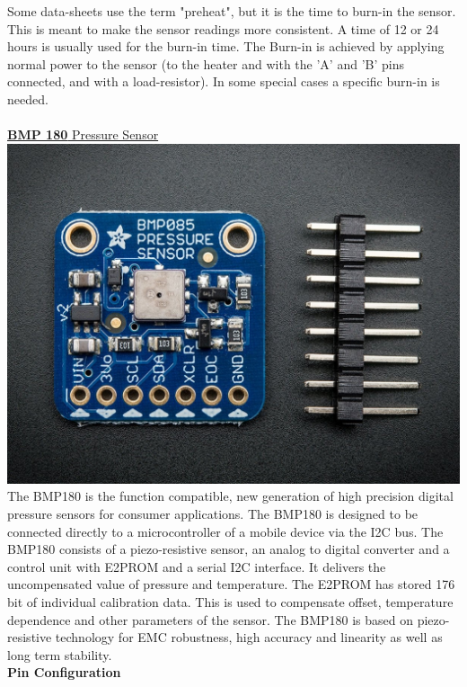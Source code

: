 \documentclass[11pt]{report}
\begin{document}
	Some data-sheets use the term "preheat", but it is the time to burn-in the sensor. This is meant to make the sensor readings more consistent. A time of 12 or 24 hours is usually used for the burn-in time.
	The Burn-in is achieved by applying normal power to the sensor (to the heater and with the 'A' and 'B' pins connected, and with a load-resistor). In some special cases a specific burn-in is needed.
	\\\\
	
	\underline{{\LARGE \textbf{BMP 180} Pressure Sensor}}
	\\
	
	\includegraphics{bmp.jpg}\\
	
	 The BMP180 is the function compatible, new generation of high precision digital pressure sensors for consumer applications. The BMP180 is designed to be connected directly to a microcontroller of a mobile device via the I2C bus. The BMP180 consists of a piezo-resistive sensor, an analog to digital converter and a control unit with E2PROM and a serial I2C interface. It delivers the uncompensated value of pressure and temperature. The E2PROM has stored 176 bit of individual calibration data. This is used to compensate offset, temperature dependence and other parameters of the sensor. The BMP180 is based on piezo-resistive technology for EMC robustness, high accuracy and linearity as well as long term stability.
	 \\
	 
	 \textbf{Pin Configuration}\\
	 
\end{document}
